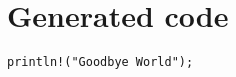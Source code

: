 \chapter{Generated code}

\begin{lstlisting}[caption={Source code of something},label=Listing]
println!("Goodbye World");
\end{lstlisting}
